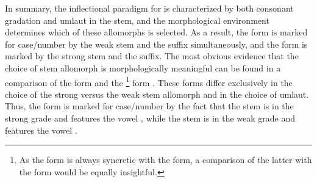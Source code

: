
In summary, the inflectional paradigm for  is characterized by both consonant gradation and umlaut in the stem, %
and the morphological environment determines which of these allomorphs is selected. %
As a result, the  form  is marked for case/number by the weak  stem and the \mbox{} suffix simultaneously, and the  form  is marked by the strong  stem and the  suffix. The most obvious evidence that the choice of stem allomorph is morphologically meaningful can be found in a comparison of the  form  and the \footnote{As the  form is always syncretic with the  form, a comparison of the latter with the  form would be equally insightful.} 
form . These forms differ exclusively in the choice of the strong versus the weak stem allomorph and in the choice of umlaut. Thus, the  form  is marked for case/number by the fact that the stem is in the strong grade and features the vowel , while the  stem is in the weak grade and features the vowel . 


